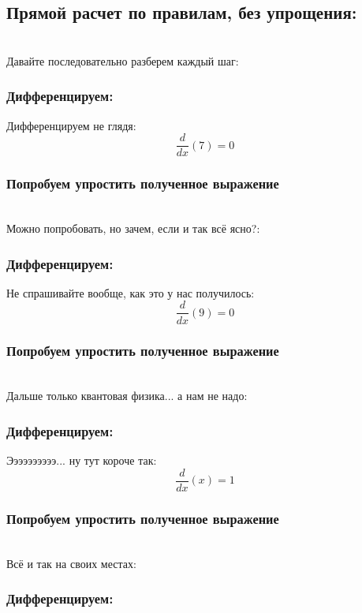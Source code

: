 \documentclass[a4paper,12pt]{article}
\begin{document}
\subsection*{Прямой расчет по правилам, без упрощения:}\\
Давайте последовательно разберем каждый шаг:

\subsubsection*{Дифференцируем:}

Дифференцируем не глядя:
\begin{dmath}\frac{d}{dx}\left(7\right)=0\end{dmath}
\subsubsection*{Попробуем упростить полученное выражение}
\\Можно попробовать, но зачем, если и так всё ясно?:

\subsubsection*{Дифференцируем:}

Не спрашивайте вообще, как это у нас получилось:
\begin{dmath}\frac{d}{dx}\left(9\right)=0\end{dmath}
\subsubsection*{Попробуем упростить полученное выражение}
\\Дальше только квантовая физика... а нам не надо:

\subsubsection*{Дифференцируем:}

Ээээээээээ... ну тут короче так:
\begin{dmath}\frac{d}{dx}\left(x\right)=1\end{dmath}
\subsubsection*{Попробуем упростить полученное выражение}
\\Всё и так на своих местах:

\subsubsection*{Дифференцируем:}
\end{document}
